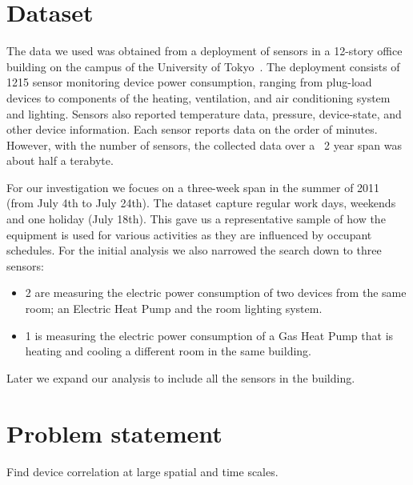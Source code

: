 \section{Dataset}
The data we used was obtained from a deployment of sensors in a 12-story office building
on the campus of the University of Tokyo~\cite{gutp, ogawa:lncs2011}.  The deployment consists of 
1215 sensor monitoring device power consumption, ranging from plug-load devices to components of the
heating, ventilation, and air conditioning system and lighting.  Sensors also reported temperature
data, pressure, device-state, and other device information.  Each sensor reports data on the
order of minutes.  However, with the number of sensors, the collected data over a ~2 year
span was about half a terabyte.



For our investigation we focues on a three-week span in the summer of 2011 (from July 4th to July 24th).
The dataset capture regular work days, weekends and one holiday (July 18th).  This gave us a representative sample
of how the equipment is used for various activities as they are influenced by occupant schedules.  For the initial
analysis we also narrowed the search down to three sensors:

\begin{itemize}
 \item 2 are measuring the electric power consumption of two devices from the same room; an Electric Heat Pump and the room lighting system.
 \item 1 is measuring the electric power consumption of a Gas Heat Pump that is heating and cooling a different room in the same building.
\end{itemize}

Later we expand our analysis to include all the sensors in the building.

\section{Problem statement}\label{problem}
Find device correlation at large spatial and time scales.

